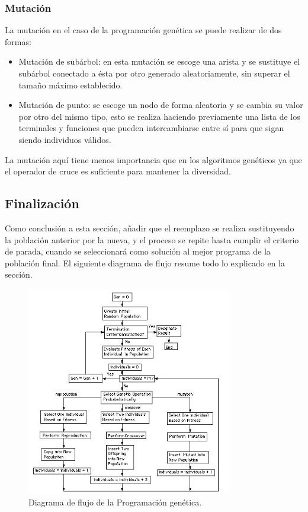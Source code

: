 \documentclass[12pt]{article} \usepackage[utf8]{inputenc}
\begin{document}
\subsubsection{Mutación}

La mutación en el caso de la programación genética se puede realizar
de dos formas:

\begin{itemize}
\item Mutación de subárbol: en esta mutación se escoge una arista y se
  sustituye el subárbol conectado a ésta por otro generado
  aleatoriamente, sin superar el tamaño máximo establecido.
\item Mutación de punto: se escoge un nodo de forma aleatoria y se
  cambia su valor por otro del mismo tipo, esto se realiza haciendo
  previamente una lista de los terminales y funciones que pueden
  intercambiarse entre sí para que sigan siendo individuos válidos.
\end{itemize}

La mutación aquí tiene menos importancia que en los algoritmos
genéticos ya que el operador de cruce es suficiente para mantener la
diversidad.

\subsection{Finalización}

Como conclusión a esta sección, añadir que el reemplazo se realiza
sustituyendo la población anterior por la nueva, y el proceso se
repite hasta cumplir el criterio de parada, cuando se seleccionará 
como solución al mejor programa de la población final.
 El siguiente diagrama de flujo resume todo lo explicado en la sección.

\begin{figure}[H]
  \centering
  \includegraphics[width=0.8\textwidth]{FlowchartGP.PNG}
  \caption{Diagrama de flujo de la Programación genética.}
  \label{fig:dfd:1}
\end{figure}
\end{document}
